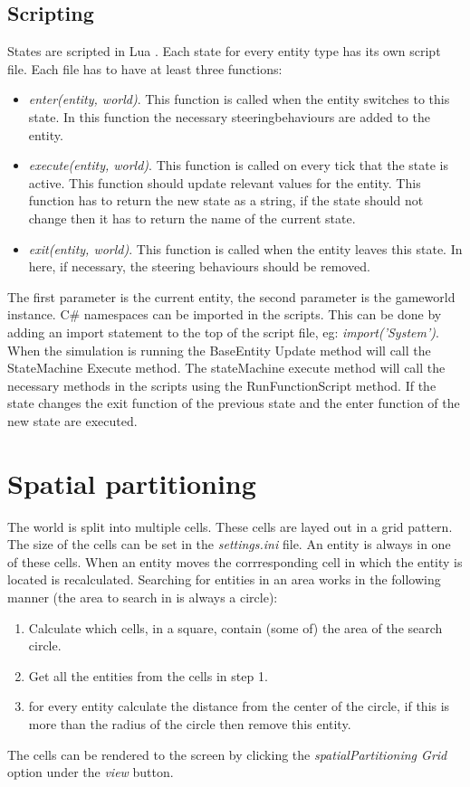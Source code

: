 \documentclass[10pt]{extarticle} %
\begin{document}
   \subsection {Scripting}
   States are scripted in Lua \cite{nlua}. Each state for every entity type has its own script file. Each file has to have at least three functions: 
   \begin{itemize}
   \item \emph{enter(entity, world)}. This function is called when the entity switches to this state. In this function the necessary steeringbehaviours are added to the entity.
   \item \emph{execute(entity, world)}. This function is called on every tick that the state is active. This function should update relevant values for the entity. This function has to return the new state as a string, if the state should not change then it has to return the name of the current state.
   \item \emph{exit(entity, world)}. This function is called when the entity leaves this state. In here, if necessary, the steering behaviours should be removed.
   \end{itemize}
   The first parameter is the current entity, the second parameter is the gameworld instance. C\# namespaces can be imported in the scripts. This can be done by adding an import statement to the top of the script file, eg: \emph{import('System')}.   
   When the simulation is running the BaseEntity Update method will call the StateMachine Execute method. The stateMachine execute method will call the necessary methods in the scripts using the RunFunctionScript method. If the state changes the exit function of the previous state and the enter function of the new state are executed.
   
   \newpage
   \section {Spatial partitioning}
   The world is split into multiple cells. These cells are layed out in a grid pattern. The size of the cells can be set in the \emph{settings.ini} file. An entity is always in one of these cells. When an entity moves the corrresponding cell in which the entity is located is recalculated. Searching for entities in an area works in the following manner (the area to search in is always a circle):
   \begin{enumerate}
   \item Calculate which cells, in a square, contain (some of) the area of the search circle.
   \item Get all the entities from the cells in step 1.
   \item for every entity calculate the distance from the center of the circle, if this is more than the radius of the circle then remove this entity.
   \end{enumerate}
   The cells can be rendered to the screen by clicking the \emph{spatialPartitioning Grid} option under the \emph{view} button. 
   
\end{document}
